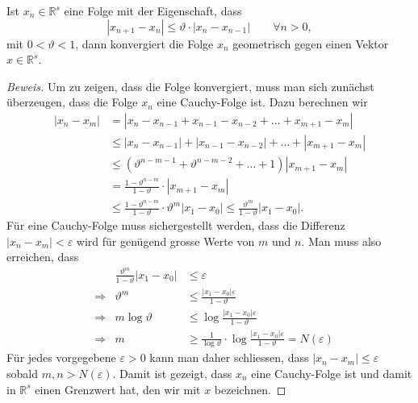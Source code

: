 \begin{lemma}
\label{lemma:konvergenz}
Ist $x_n\in\mathbb R^s$ eine Folge mit der Eigenschaft, dass 
\[
|x_{n+1}-x_n| \le \vartheta\cdot|x_n-x_{n-1}|
\qquad
\forall n > 0,
\]
mit $0 < \vartheta  < 1$, dann konvergiert die Folge $x_n$ geometrisch
gegen einen Vektor $x\in\mathbb R^s$.
\end{lemma}

\begin{proof}[Beweis]
Um zu zeigen, dass die Folge konvergiert, muss man sich zunächst überzeugen,
dass die Folge $x_n$ eine Cauchy-Folge ist.
Dazu berechnen wir
\begin{align*}
|x_n-x_m|
&=
|x_n - x_{n-1}
     + x_{n-1} - x_{n-2}
               + \dots + x_{m+1} - x_m|
\\
&\le
|x_n-x_{n-1}|
+
|x_{n-1}-x_{n-2}|
+\dots+
|x_{m+1}-x_{m}|
\\
&\le
(
\vartheta^{n-m-1}
+
\vartheta^{n-m-2}
+
\dots
+
1
)
|x_{m+1}-x_{m}|
\\
&=
\frac{1-\vartheta^{n-m}}{1-\vartheta}
\cdot
|x_{m+1}-x_{m}|
\\
&\le 
\frac{1-\vartheta^{n-m}}{1-\vartheta}
\cdot
\vartheta^{m}
|x_{1}-x_{0}|
\le
\frac{\vartheta^m}{1-\vartheta}
|x_{1}-x_{0}|.
\end{align*}
Für eine Cauchy-Folge muss sichergestellt werden, dass die Differenz
$|x_n-x_m| <\varepsilon$ wird für genügend grosse Werte von $m$ und $n$.
Man muss also erreichen, dass
\begin{align*}
&&
\frac{\vartheta^m}{1-\vartheta} |x_1-x_0|
&\le \varepsilon
\\
&\Rightarrow&
\vartheta^m &\le \frac{|x_1-x_0|\varepsilon}{1-\vartheta}
\\
&\Rightarrow&
m\log \vartheta &\le \log \frac{|x_1-x_0|\varepsilon}{1-\vartheta}
\\
&\Rightarrow&
m&\ge \frac{1}{\log\vartheta}\cdot \log \frac{|x_1-x_0|\varepsilon}{1-\vartheta}
=
N(\varepsilon)
\end{align*}
Für jedes vorgegebene $\varepsilon>0$ kann man daher schliessen, dass
$|x_n-x_m|\le \varepsilon$ sobald $m,n>N(\varepsilon)$.
Damit ist gezeigt, dass $x_n$ eine Cauchy-Folge ist und damit in $\mathbb R^s$
einen Grenzwert hat, den wir mit $x$ bezeichnen.


\end{proof}
